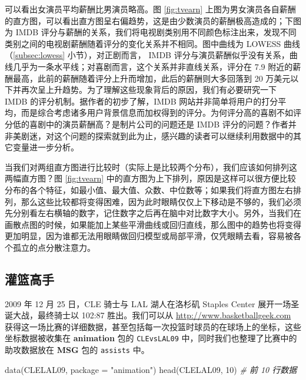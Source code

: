 \documentclass[
  b5paper,
  UTF8,twoside]{book}
\newenvironment{Shaded}{\begin{snugshade}}{\end{snugshade}}
\newcommand{\AttributeTok}[1]{\textcolor[rgb]{0.77,0.63,0.00}{#1}}
\newcommand{\CommentTok}[1]{\textcolor[rgb]{0.56,0.35,0.01}{\textit{#1}}}
\newcommand{\DecValTok}[1]{\textcolor[rgb]{0.00,0.00,0.81}{#1}}
\newcommand{\FunctionTok}[1]{\textcolor[rgb]{0.00,0.00,0.00}{#1}}
\newcommand{\NormalTok}[1]{#1}
\newcommand{\StringTok}[1]{\textcolor[rgb]{0.31,0.60,0.02}{#1}}
\begin{document}
可以看出女演员平均薪酬比男演员略高。图 \ref{fig:tvearn} 上图为男女演员各自薪酬的直方图，可以看出直方图呈右偏趋势，这是由少数演员的薪酬极高造成的；下图为 IMDB 评分与薪酬的关系，我们将电视剧类别用不同颜色标注出来，发现不同类别之间的电视剧薪酬随着评分的变化关系并不相同。图中曲线为 LOWESS 曲线（\ref{subsec:lowess} 小节），对正剧而言， IMDB 评分与演员薪酬似乎没有关系，曲线几乎为一条水平线；对喜剧而言，这个关系并非直线关系，评分在 7.9 附近的薪酬最高，此前的薪酬随着评分上升而增加，此后的薪酬则大多回落到 20 万美元以下并再次呈上升趋势。为了理解这些现象背后的原因，我们有必要研究一下 IMDB 的评分机制。据作者的初步了解，IMDB 网站并非简单将用户的打分平均，而是综合考虑诸多用户背景信息而加权得到的评分。为何评分高的喜剧不如评分低的喜剧中的演员薪酬高？是制片公司的问题还是 IMDB 评分的问题？作者并非美剧迷，对这个问题的探索就到此为止，感兴趣的读者可以继续利用数据中的其它变量进一步分析。

当我们对两组直方图进行比较时（实际上是比较两个分布），我们应该如何排列这两幅直方图？图 \ref{fig:tvearn} 中的直方图为上下排列，原因是这样可以很方便比较分布的各个特征，如最小值、最大值、众数、中位数等；如果我们将直方图左右排列，那么这些比较都将变得困难，因为此时眼睛仅仅上下移动是不够的，我们必须先分别看左右横轴的数字，记住数字之后再在脑中对比数字大小。另外，当我们在画散点图的时候，如果能加上某些平滑曲线或回归直线，那么图中的趋势也将变得更加明显，因为谁都无法用眼睛做回归模型或局部平滑，仅凭眼睛去看，容易被各个孤立的点分散注意力。

\hypertarget{ux704cux7beeux9ad8ux624b}{%
\subsection{灌篮高手}\label{ux704cux7beeux9ad8ux624b}}

2009 年 12 月 25 日，CLE 骑士与 LAL 湖人在洛杉矶 Staples Center 展开一场圣诞大战，最终骑士以 102:87 胜出。我们可以从 \url{http://www.basketballgeek.com} 获得这一场比赛的详细数据，甚至包括每一次投篮时球员的在球场上的坐标，这些坐标数据被收集在 \textbf{animation} 包的 \texttt{CLEvsLAL09} 中，同时我们也整理了比赛中的助攻数据放在 \textbf{MSG} 包的 \texttt{assists} 中。

\begin{Shaded}
\begin{Highlighting}[]
\FunctionTok{data}\NormalTok{(CLELAL09, }\AttributeTok{package =} \StringTok{"animation"}\NormalTok{)}
\FunctionTok{head}\NormalTok{(CLELAL09, }\DecValTok{10}\NormalTok{) }\CommentTok{\# 前 10 行数据}
\end{Highlighting}
\end{Shaded}
\end{document}
